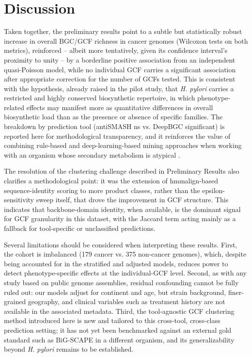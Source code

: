 \documentclass[12pt]{article}
\begin{document}
\section{Discussion}

Taken together, the preliminary results point to a subtle but statistically robust increase in overall BGC/GCF richness in cancer genomes (Wilcoxon tests on both metrics), reinforced -- albeit more tentatively, given its confidence interval's proximity to unity -- by a borderline positive association from an independent quasi-Poisson model, while no individual GCF carries a significant association after appropriate correction for the number of GCFs tested. This is consistent with the hypothesis, already raised in the pilot study, that \textit{H. pylori} carries a restricted and highly conserved biosynthetic repertoire, in which phenotype-related effects may manifest more as quantitative differences in overall biosynthetic load than as the presence or absence of specific families. The breakdown by prediction tool (antiSMASH ns vs. DeepBGC significant) is reported here for methodological transparency, and it reinforces the value of combining rule-based and deep-learning-based mining approaches when working with an organism whose secondary metabolism is atypical \cite{zhu2025}.

The resolution of the clustering challenge described in Preliminary Results also clarifies a methodological point: it was the extension of hmmalign-based sequence-identity scoring to more product classes, rather than the epsilon-sensitivity sweep itself, that drove the improvement in GCF structure. This indicates that backbone-domain identity, when available, is the dominant signal for GCF granularity in this dataset, with the Jaccard term acting mainly as a fallback for tool-specific or unclassified predictions.

Several limitations should be considered when interpreting these results. First, the cohort is imbalanced (179 cancer vs. 375 non-cancer genomes), which, despite being accounted for in the stratified and adjusted models, reduces power to detect phenotype-specific effects at the individual-GCF level. Second, as with any study based on public genome assemblies, residual confounding cannot be fully ruled out: our models adjust for continent and age, but strain background, finer-grained geography, and clinical variables such as treatment history are not available in the associated metadata. Third, the tool-agnostic GCF clustering method introduced here is new and tailored to this cross-tool, cross-class prediction setting; it has not yet been benchmarked against an external gold standard such as BiG-SCAPE in a different organism, and its generalizability beyond \textit{H. pylori} remains to be established.
\end{document}
